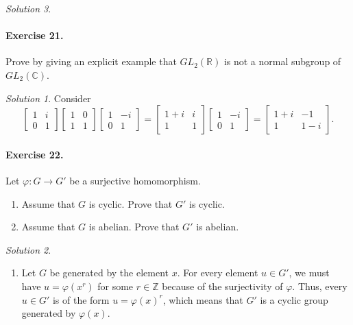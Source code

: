 \documentclass[11pt]{report}
\def\C{\mathbb{C}}
\def\R{\mathbb{R}}
\def\Z{\mathbb{Z}}
\theoremstyle{remark}
\newtheorem*{solution}{Solution}
\begin{document}
\begin{solution}
    \paragraph{Exercise 21.} Prove by giving an explicit example that $GL_2(\R)$ is
    not a normal subgroup of $GL_2(\C)$.
    \begin{solution}
        Consider \[
            \begin{bmatrix}
                1 & i \\ 0 & 1
            \end{bmatrix} \begin{bmatrix}
                1 & 0 \\ 1 & 1
            \end{bmatrix} \begin{bmatrix}
                1 & -i \\ 0 & 1
            \end{bmatrix} = \begin{bmatrix}
                1 + i & i \\ 1 & 1
            \end{bmatrix} \begin{bmatrix}
                1 & -i \\ 0 & 1
            \end{bmatrix} = \begin{bmatrix}
                1 + i & -1 \\ 1 & 1 - i
            \end{bmatrix}.
        \] 
    \end{solution}

    \paragraph{Exercise 22.} Let $\varphi\colon G \to G'$ be a surjective homomorphism.
    \begin{enumerate}
        \itemsep0em
        \item Assume that $G$ is cyclic. Prove that $G'$ is cyclic.
        \item Assume that $G$ is abelian. Prove that $G'$ is abelian.
    \end{enumerate}
    \begin{solution} \mbox{}
    \begin{enumerate}
        \item Let $G$ be generated by the element $x$. For every element $u \in G'$,
        we must have $u = \varphi(x^r)$ for some $r \in \Z$ because of the
        surjectivity of $\varphi$. Thus, every $u \in G'$ is of the form $u =
        \varphi(x)^r$, which means that $G'$ is a cyclic group generated by
        $\varphi(x)$.


\end{enumerate}
\end{solution}
\end{solution}
\end{document}
